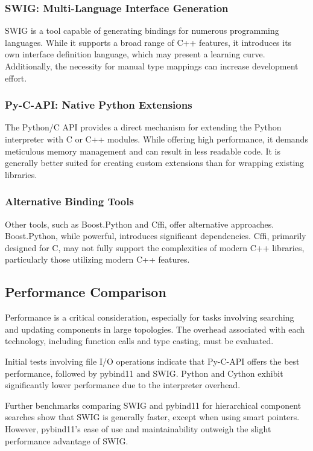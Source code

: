 \subsubsection{SWIG: Multi-Language Interface Generation}

SWIG is a tool capable of generating bindings for numerous programming languages. While it supports a broad range of C++ features, it introduces its own interface definition language, which may present a learning curve. Additionally, the necessity for manual type mappings can increase development effort.

\subsubsection{Py-C-API: Native Python Extensions}

The Python/C API provides a direct mechanism for extending the Python interpreter with C or C++ modules. While offering high performance, it demands meticulous memory management and can result in less readable code. It is generally better suited for creating custom extensions than for wrapping existing libraries.

\subsubsection{Alternative Binding Tools}

Other tools, such as Boost.Python and Cffi, offer alternative approaches. Boost.Python, while powerful, introduces significant dependencies. Cffi, primarily designed for C, may not fully support the complexities of modern C++ libraries, particularly those utilizing modern C++ features.
\subsection{Performance Comparison}

Performance is a critical consideration, especially for tasks involving searching and updating components in large topologies. The overhead associated with each technology, including function calls and type casting, must be evaluated.

Initial tests involving file I/O operations indicate that Py-C-API offers the best performance, followed by pybind11 and SWIG. Python and Cython exhibit significantly lower performance due to the interpreter overhead.

Further benchmarks comparing SWIG and pybind11 for hierarchical component searches show that SWIG is generally faster, except when using smart pointers. However, pybind11's ease of use and maintainability outweigh the slight performance advantage of SWIG.


